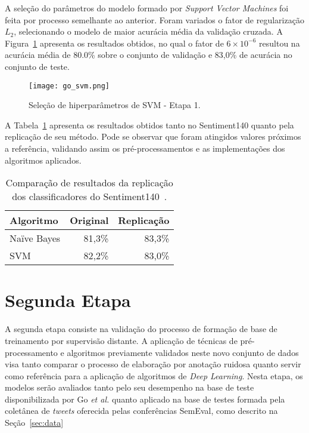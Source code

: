 A seleção do parâmetros do modelo formado por \textit{Support Vector Machines} foi feita por processo semelhante ao
anterior.
Foram variados o fator de regularização $L_{2}$, selecionando o modelo de maior acurácia média da validação cruzada.
A Figura~\ref{fig:go_svm} apresenta os resultados obtidos, no qual o fator de $6 \times 10^{-6}$ resultou na acurácia
média de 80.0\% sobre o conjunto de validação e 83,0\% de acurácia no conjunto de teste.

\begin{figure}
\begin{center} {
    \begin{center}
    \texttt{[image: go\_svm.png]}
    \caption{Seleção de hiperparâmetros de SVM - Etapa 1.}
    \label{fig:go_svm}
    \end{center}
}
\end{center}
\end{figure}

A Tabela~\ref{tab:go_compara} apresenta os resultados obtidos tanto no Sentiment140 quanto pela replicação de
seu método.
Pode se observar que foram atingidos valores próximos a referência, validando assim os pré-processamentos e as
implementações dos algoritmos aplicados.

\begin{table}[h]
    \begin{center}
        \begin{tabular}{| l | r | r |}
        \hline
        \textbf{Algoritmo} & \textbf{Original} & \textbf{Replicação} \\ \hline
        Naïve Bayes & 81,3\% & 83,3\% \\ \hline
        SVM &  82,2\% & 83,0\% \\ \hline
        \end{tabular}
        \caption{Comparação de resultados da replicação dos classificadores do Sentiment140~\cite{go09}.}
        \label{tab:go_compara}
    \end{center}
\end{table}

\section{Segunda Etapa}

A segunda etapa consiste na validação do processo de formação de base de treinamento por supervisão distante.
A aplicação de técnicas de pré-processamento e algoritmos previamente validados neste novo conjunto de dados visa tanto
comparar o processo de elaboração por anotação ruidosa quanto servir como referência para a aplicação de algoritmos de
\textit{Deep Learning}.
Nesta etapa, os modelos serão avaliados tanto pelo seu desempenho na base de teste disponibilizada por Go
\textit{et al.} quanto aplicado na base de testes formada pela coletânea de \textit{tweets} oferecida pelas conferências
SemEval, como descrito na Seção~\ref{sec:data}


